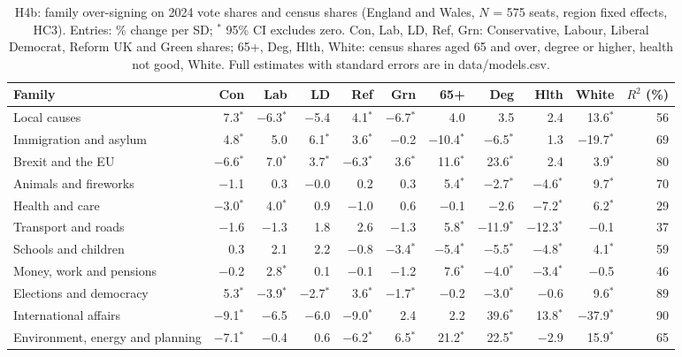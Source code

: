 \documentclass[11pt,a4paper]{article}
\begin{document}
\begin{table}[tbp]\centering\scriptsize\caption{H4b: family over-signing on 2024 vote shares and census shares (England and Wales, $N$ = 575 seats, region fixed effects, HC3). Entries: \% change per SD; $^{*}$ 95\% CI excludes zero. Con, Lab, LD, Ref, Grn: Conservative, Labour, Liberal Democrat, Reform UK and Green shares; 65+, Deg, Hlth, White: census shares aged 65 and over, degree or higher, health not good, White. Full estimates with standard errors are in data/models.csv.}\label{tab:h4b}\setlength{\tabcolsep}{3pt}\begin{tabular}{lrrrrrrrrrr}\toprule Family & Con & Lab & LD & Ref & Grn & 65+ & Deg & Hlth & White & $R^2$ (\%)\\\midrule
Local causes & 7.3$^{*}$ & $-$6.3$^{*}$ & $-$5.4 & 4.1$^{*}$ & $-$6.7$^{*}$ & 4.0 & 3.5 & 2.4 & 13.6$^{*}$ & 56\\
Immigration and asylum & 4.8$^{*}$ & 5.0 & 6.1$^{*}$ & 3.6$^{*}$ & $-$0.2 & $-$10.4$^{*}$ & $-$6.5$^{*}$ & 1.3 & $-$19.7$^{*}$ & 69\\
Brexit and the EU & $-$6.6$^{*}$ & 7.0$^{*}$ & 3.7$^{*}$ & $-$6.3$^{*}$ & 3.6$^{*}$ & 11.6$^{*}$ & 23.6$^{*}$ & 2.4 & 3.9$^{*}$ & 80\\
Animals and fireworks & $-$1.1 & 0.3 & $-$0.0 & 0.2 & 0.3 & 5.4$^{*}$ & $-$2.7$^{*}$ & $-$4.6$^{*}$ & 9.7$^{*}$ & 70\\
Health and care & $-$3.0$^{*}$ & 4.0$^{*}$ & 0.9 & $-$1.0 & 0.6 & $-$0.1 & $-$2.6 & $-$7.2$^{*}$ & 6.2$^{*}$ & 29\\
Transport and roads & $-$1.6 & $-$1.3 & 1.8 & 2.6 & $-$1.3 & 5.8$^{*}$ & $-$11.9$^{*}$ & $-$12.3$^{*}$ & $-$0.1 & 37\\
Schools and children & 0.3 & 2.1 & 2.2 & $-$0.8 & $-$3.4$^{*}$ & $-$5.4$^{*}$ & $-$5.5$^{*}$ & $-$4.8$^{*}$ & 4.1$^{*}$ & 59\\
Money, work and pensions & $-$0.2 & 2.8$^{*}$ & 0.1 & $-$0.1 & $-$1.2 & 7.6$^{*}$ & $-$4.0$^{*}$ & $-$3.4$^{*}$ & $-$0.5 & 46\\
Elections and democracy & 5.3$^{*}$ & $-$3.9$^{*}$ & $-$2.7$^{*}$ & 3.6$^{*}$ & $-$1.7$^{*}$ & $-$0.2 & $-$3.0$^{*}$ & $-$0.6 & 9.6$^{*}$ & 89\\
International affairs & $-$9.1$^{*}$ & $-$6.5 & $-$6.0 & $-$9.0$^{*}$ & 2.4 & 2.2 & 39.6$^{*}$ & 13.8$^{*}$ & $-$37.9$^{*}$ & 90\\
Environment, energy and planning & $-$7.1$^{*}$ & $-$0.4 & 0.6 & $-$6.2$^{*}$ & 6.5$^{*}$ & 21.2$^{*}$ & 22.5$^{*}$ & $-$2.9 & 15.9$^{*}$ & 65\\

\end{tabular}
\end{table}
\end{document}

